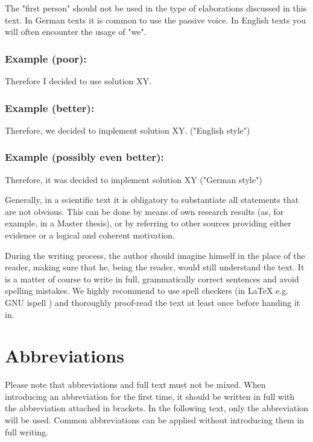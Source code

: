 The "first person" should not be used in the type of elaborations discussed in
this text. In German texts it is common to use the passive voice. In English texts you will often encounter the usage of "we".

    \begin{example}
      \subsubsection*{Example (poor):}
      Therefore I decided to use solution XY.

      \subsubsection*{Example (better):}
      Therefore, we decided to implement solution XY. ("English style")

      \subsubsection*{Example (possibly even better):}
      Therefore, it was decided to implement solution XY ("German style")
    \end{example}

Generally, in a scientific text it is obligatory to substantiate all statements
that are not obvious. This can be done by means of own research results (as, for
example, in a Master thesis), or by referring to other sources providing either
evidence or a logical and coherent motivation.

During the writing process, the author should imagine himself in the place of the reader, making sure that he, being the reader, would still understand the text.
It is a matter of course to write in full, grammatically correct sentences and
avoid spelling mistakes. We highly recommend to use spell checkers (in LaTeX e.g. GNU ispell \cite{ispell_homepage}) and thoroughly proof-read the text at least once before handing it in.

\section{Abbreviations}
Please note that abbreviations and full text must not be mixed. When introducing an abbreviation for the first time, it should be written in full with the  abbreviation attached in brackets. In the following text, only the abbreviation will be used. Common abbreviations can be applied without introducing them in full writing.

